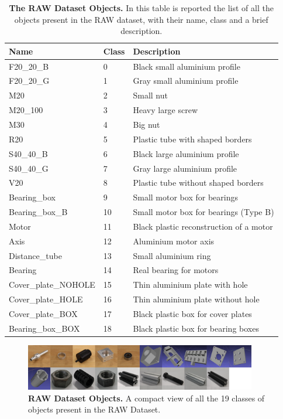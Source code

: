 \begin{table}
    \centering
    \begin{tabular}{| l | l | l |}
    \hline
    \textbf{Name} & \textbf{Class} & \textbf{Description} \\ \hline
    F20\_20\_B & 0 & Black small aluminium profile \\
    F20\_20\_G & 1 & Gray small aluminium profile \\
    M20 & 2 & Small nut \\
    M20\_100 & 3 & Heavy large screw \\
    M30 & 4 & Big nut \\
    R20 & 5 & Plastic tube with shaped borders \\
    S40\_40\_B & 6 & Black large aluminium profile \\
    S40\_40\_G & 7 & Gray large aluminium profile \\
    V20 & 8 & Plastic tube without shaped borders \\
    Bearing\_box & 9 & Small motor box for bearings \\
    Bearing\_box\_B & 10 & Small motor box for bearings (Type B) \\
    Motor & 11 & Black plastic reconstruction of a motor \\
    Axis & 12 & Aluminium motor axis \\
    Distance\_tube & 13 & Small aluminium ring \\
    Bearing & 14 & Real bearing for motors \\
    Cover\_plate\_NOHOLE & 15 & Thin aluminium plate with hole \\
    Cover\_plate\_HOLE & 16 & Thin aluminium plate without hole \\
    Cover\_plate\_BOX & 17 & Black plastic box for cover plates \\
    Bearing\_box\_BOX & 18 & Black plastic box for bearing boxes \\
    \hline
    \end{tabular}
    \caption{\textbf{The RAW Dataset Objects.} In this table is reported the list of all the objects present in the RAW dataset, with their name, class and a brief description.}
    \label{tab:raw_objs_list}
\end{table}

\begin{figure}
    \centering
    \includegraphics[width=0.9\textwidth]{figures/3_raw_dataset/raw_obj_examples}
    \caption{\textbf{RAW Dataset Objects.} A compact view of all the 19 classes of objects present in the RAW Dataset.}
    \label{fig:raw_obj_examples}
\end{figure}

